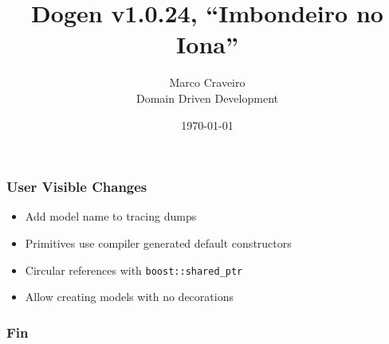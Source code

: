 \documentclass{beamer}
\title{Dogen v1.0.24, \enquote{Imbondeiro no Iona}}
\author{Marco Craveiro \\
  Domain Driven Development
}
\date{\today}
\begin{document}
\begin{frame}
\titlepage{}
\end{frame}

\begin{frame}
\frametitle{User Visible Changes}

\begin{itemize}
  \pause{}
\item Add model name to tracing dumps
  \pause{}
\item Primitives use compiler generated default constructors
  \pause{}
\item Circular references with \texttt{boost::shared\_ptr}
  \pause{}
\item Allow creating models with no decorations
  \pause{}
\end{itemize}

\end{frame}

\begin{frame}
\frametitle{Fin}
\end{frame}
\end{document}
